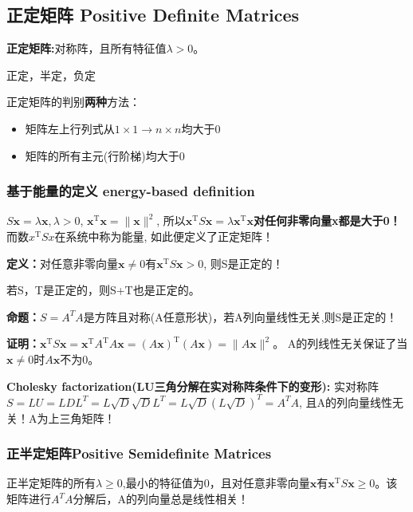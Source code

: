     \subsection{正定矩阵 Positive Definite Matrices}
    \textbf{正定矩阵:}对称阵，且所有特征值$\lambda >0$。

    正定，半定，负定

    正定矩阵的判别\textbf{两种}方法：
    \begin{itemize}
        \item 矩阵左上行列式从$1\times 1 \rightarrow n\times n$均大于0
        \item 矩阵的所有主元(行阶梯)均大于0
    \end{itemize}
    \subsubsection{基于能量的定义 energy-based definition}
    $S \boldsymbol{x}=\lambda \boldsymbol{x}, \lambda >0$, $\boldsymbol{x}^{\mathrm{T}} \boldsymbol{x}=\|\boldsymbol{x}\|^{2}$, 所以$\boldsymbol{x}^{\mathrm{T}} S \boldsymbol{x}=\lambda \boldsymbol{x}^{\mathrm{T}} \boldsymbol{x}$\textbf{对任何非零向量x都是大于0！}
    而数$x^{\mathrm{T}} S x$在系统中称为能量, 如此便定义了正定矩阵！

    \textbf{定义：}对任意非零向量$\bm{x}\neq 0$有$\bm{x}^{\mathrm{T}} S \bm{x}>0$, 则S是正定的！

    若S，T是正定的，则S+T也是正定的。

    \textbf{命题：}$S=A^{T}A$是方阵且对称(A任意形状)，若A列向量线性无关,则S是正定的！

    \textbf{证明：}$\bm{x}^{\mathrm{T}} S \bm{x}= \boldsymbol{x}^{\mathrm{T}} A^{\mathrm{T}} A \bm{x} =(A \boldsymbol{x})^{\mathrm{T}}(A \boldsymbol{x})=\|A \boldsymbol{x}\|^{2}$。
    A的列线性无关保证了当$\bm{x} \neq 0$时$A \boldsymbol{x}$不为0。

    \textbf{Cholesky factorization(LU三角分解在实对称阵条件下的变形):} 实对称阵$S=LU=LDL^{T}=L\sqrt{D} \sqrt{D}L^{T}=L\sqrt{D} (L \sqrt{D})^{T}=A^{T}A $, 且A的列向量线性无关！A为上三角矩阵！

    \subsubsection{正半定矩阵Positive Semidefinite Matrices}
    正半定矩阵的所有$\lambda \geq 0$,最小的特征值为0，且对任意非零向量$\bm{x}$有$\boldsymbol{x}^{\mathrm{T}} S \boldsymbol{x} \geq 0$。该矩阵进行$A^{T}A$分解后，A的列向量总是线性相关！

